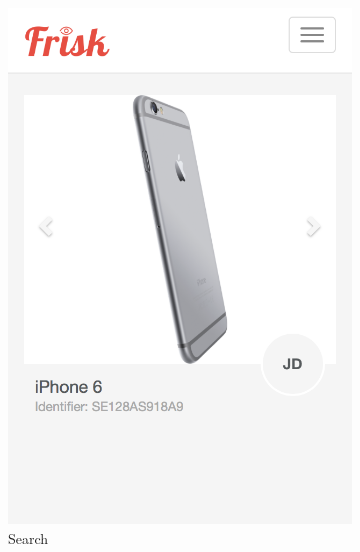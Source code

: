 \begin{figure}[H]
\begin{subfigure}[t]{0.3\textwidth}
		\includegraphics[width=1.0\textwidth]{images/Frisk/Mobile_Search}
		\caption{Search}\label{fig:Mobile_Search}
	\end{subfigure}
	\quad
	\begin{subfigure}[t]{0.3\textwidth}
		\centering

\end{subfigure}
\end{figure}
